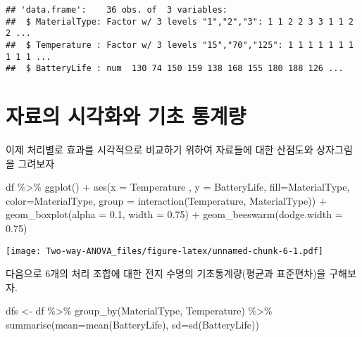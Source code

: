 \documentclass[
]{book}
\newenvironment{Shaded}{\begin{snugshade}}{\end{snugshade}}
\newcommand{\AttributeTok}[1]{\textcolor[rgb]{0.77,0.63,0.00}{#1}}
\newcommand{\FloatTok}[1]{\textcolor[rgb]{0.00,0.00,0.81}{#1}}
\newcommand{\FunctionTok}[1]{\textcolor[rgb]{0.00,0.00,0.00}{#1}}
\newcommand{\NormalTok}[1]{#1}
\newcommand{\OtherTok}[1]{\textcolor[rgb]{0.56,0.35,0.01}{#1}}
\newcommand{\SpecialCharTok}[1]{\textcolor[rgb]{0.00,0.00,0.00}{#1}}
\begin{document}
\begin{verbatim}
## 'data.frame':    36 obs. of  3 variables:
##  $ MaterialType: Factor w/ 3 levels "1","2","3": 1 1 2 2 3 3 1 1 2 2 ...
##  $ Temperature : Factor w/ 3 levels "15","70","125": 1 1 1 1 1 1 1 1 1 1 ...
##  $ BatteryLife : num  130 74 150 159 138 168 155 180 188 126 ...
\end{verbatim}

\hypertarget{uxc790uxb8ccuxc758-uxc2dcuxac01uxd654uxc640-uxae30uxcd08-uxd1b5uxacc4uxb7c9}{%
\section{자료의 시각화와 기초 통계량}\label{uxc790uxb8ccuxc758-uxc2dcuxac01uxd654uxc640-uxae30uxcd08-uxd1b5uxacc4uxb7c9}}

이제 처리별로 효과를 시각적으로 비교하기 위하여 자료들에 대한 산점도와 상자그림을 그려보자

\begin{Shaded}
\begin{Highlighting}[]
\NormalTok{df }\SpecialCharTok{\%\textgreater{}\%} 
  \FunctionTok{ggplot}\NormalTok{() }\SpecialCharTok{+}
  \FunctionTok{aes}\NormalTok{(}\AttributeTok{x =}\NormalTok{ Temperature , }\AttributeTok{y =}\NormalTok{ BatteryLife, }\AttributeTok{fill=}\NormalTok{MaterialType, }\AttributeTok{color=}\NormalTok{MaterialType, }\AttributeTok{group =} \FunctionTok{interaction}\NormalTok{(Temperature, MaterialType)) }\SpecialCharTok{+}
  \FunctionTok{geom\_boxplot}\NormalTok{(}\AttributeTok{alpha =} \FloatTok{0.1}\NormalTok{, }\AttributeTok{width =} \FloatTok{0.75}\NormalTok{) }\SpecialCharTok{+}
  \FunctionTok{geom\_beeswarm}\NormalTok{(}\AttributeTok{dodge.width =} \FloatTok{0.75}\NormalTok{)}
\end{Highlighting}
\end{Shaded}

\texttt{[image: Two-way-ANOVA\_files/figure-latex/unnamed-chunk-6-1.pdf]}

다음으로 6개의 처리 조합에 대한 전지 수명의 기초통계량(평균과 표준편차)을 구해보자.

\begin{Shaded}
\begin{Highlighting}[]
\NormalTok{dfs }\OtherTok{\textless{}{-}}\NormalTok{ df }\SpecialCharTok{\%\textgreater{}\%} \FunctionTok{group\_by}\NormalTok{(MaterialType, Temperature)  }\SpecialCharTok{\%\textgreater{}\%}  \FunctionTok{summarise}\NormalTok{(}\AttributeTok{mean=}\FunctionTok{mean}\NormalTok{(BatteryLife),  }\AttributeTok{sd=}\FunctionTok{sd}\NormalTok{(BatteryLife))}
\end{Highlighting}
\end{Shaded}
\end{document}
